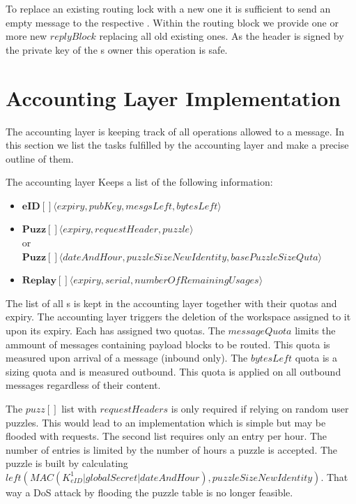 To replace an existing routing lock with a new one it is sufficient to send an empty message to the respective . Within the routing block we provide one or more new $replyBlock$ replacing all old existing ones. As the header is signed by the private key of the s owner this operation is safe.

\chapter{Accounting Layer Implementation}
The accounting layer is keeping track of all operations allowed to a message. In this section we list the tasks fulfilled by the accounting layer and make a precise outline of them.

The accounting layer Keeps a list of the following information:
\begin{itemize}
	\item $\mathbf{eID[]}\langle expiry, pubKey, mesgsLeft, bytesLeft \rangle$\\
	\item $\mathbf{Puzz[]}\langle expiry, requestHeader, puzzle \rangle$\\
	      or\\
	      $\mathbf{Puzz[]}\langle dateAndHour, puzzleSizeNewIdentity, basePuzzleSizeQuta \rangle$\\
	\item $\mathbf{Replay[]}\langle expiry, serial, numberOfRemainingUsages \rangle$\\
\end{itemize}

The list of all s is kept in the accounting layer together with their quotas and expiry. The accounting layer triggers the deletion of the workspace assigned to it upon its expiry. Each  has assigned two quotas. The $messageQuota$ limits the ammount of messages containing payload blocks to be routed. This quota is measured upon arrival of a message (inbound only). The $bytesLeft$ quota is a sizing quota and is measured outbound. This quota is applied on all outbound messages regardless of their content.

The $puzz[]$ list with $requestHeaders$ is only required if relying on random user puzzles. This would lead to an implementation which is simple but may be flooded with  requests. The second list requires only an entry per hour. The number of entries is limited by the number of hours a puzzle is accepted. The puzzle is built by calculating  $left(MAC(K^1_{eID} | globalSecret | dateAndHour ), puzzleSizeNewIdentity)$. That way a DoS attack by flooding the puzzle table is no longer feasible.

